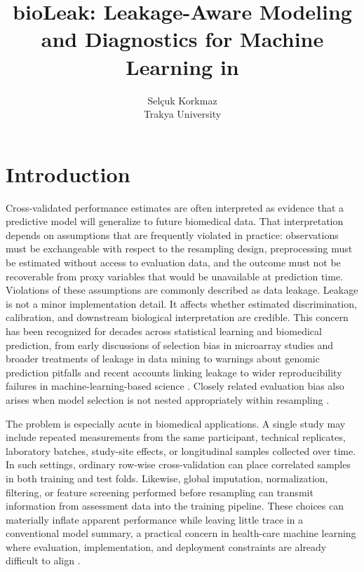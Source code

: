 \documentclass[article]{jss}
\author{Selçuk Korkmaz\\Trakya University}
\title{bioLeak: Leakage-Aware Modeling and Diagnostics for Machine Learning in \proglang{R}}
\begin{document}


\section[Introduction]{Introduction}\label{sec:intro}

Cross-validated performance estimates are often interpreted as evidence that a predictive model will generalize to future biomedical data. That interpretation depends on assumptions that are frequently violated in practice: observations must be exchangeable with respect to the resampling design, preprocessing must be estimated without access to evaluation data, and the outcome must not be recoverable from proxy variables that would be unavailable at prediction time. Violations of these assumptions are commonly described as data leakage. Leakage is not a minor implementation detail. It affects whether estimated discrimination, calibration, and downstream biological interpretation are credible. This concern has been recognized for decades across statistical learning and biomedical prediction, from early discussions of selection bias in microarray studies \citep{ambroise2002} and broader treatments of leakage in data mining \citep{kaufman2012} to warnings about genomic prediction pitfalls \citep{simon2003, subramanian2013} and recent accounts linking leakage to wider reproducibility failures in machine-learning-based science \citep{kapoor2023}. Closely related evaluation bias also arises when model selection is not nested appropriately within resampling \citep{varma2006, cawley2010}.

The problem is especially acute in biomedical applications. A single study may include repeated measurements from the same participant, technical replicates, laboratory batches, study-site effects, or longitudinal samples collected over time. In such settings, ordinary row-wise cross-validation can place correlated samples in both training and test folds. Likewise, global imputation, normalization, filtering, or feature screening performed before resampling can transmit information from assessment data into the training pipeline. These choices can materially inflate apparent performance while leaving little trace in a conventional model summary, a practical concern in health-care machine learning where evaluation, implementation, and deployment constraints are already difficult to align \citep{beam2018, sendak2019}.
\end{document}
